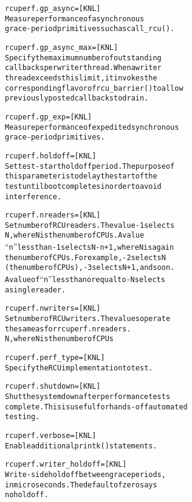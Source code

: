 \documentclass[a4paper,8pt,english]{sphinxmanual}
\begin{document}
\begin{alltt}
        rcuperf.gp\_async= {[}KNL{]}
                        Measure performance of asynchronous
                        grace-period primitives such as call\_rcu().

        rcuperf.gp\_async\_max= {[}KNL{]}
                        Specify the maximum number of outstanding
                        callbacks per writer thread.  When a writer
                        thread exceeds this limit, it invokes the
                        corresponding flavor of rcu\_barrier() to allow
                        previously posted callbacks to drain.

        rcuperf.gp\_exp= {[}KNL{]}
                        Measure performance of expedited synchronous
                        grace-period primitives.

        rcuperf.holdoff= {[}KNL{]}
                        Set test-start holdoff period.  The purpose of
                        this parameter is to delay the start of the
                        test until boot completes in order to avoid
                        interference.

        rcuperf.nreaders= {[}KNL{]}
                        Set number of RCU readers.  The value -1 selects
                        N, where N is the number of CPUs.  A value
                        ``n'' less than -1 selects N-n+1, where N is again
                        the number of CPUs.  For example, -2 selects N
                        (the number of CPUs), -3 selects N+1, and so on.
                        A value of ``n'' less than or equal to -N selects
                        a single reader.

        rcuperf.nwriters= {[}KNL{]}
                        Set number of RCU writers.  The values operate
                        the same as for rcuperf.nreaders.
                        N, where N is the number of CPUs

        rcuperf.perf\_type= {[}KNL{]}
                        Specify the RCU implementation to test.

        rcuperf.shutdown= {[}KNL{]}
                        Shut the system down after performance tests
                        complete.  This is useful for hands-off automated
                        testing.

        rcuperf.verbose= {[}KNL{]}
                        Enable additional printk() statements.

        rcuperf.writer\_holdoff= {[}KNL{]}
                        Write-side holdoff between grace periods,
                        in microseconds.  The default of zero says
                        no holdoff.


\end{alltt}
\end{document}
